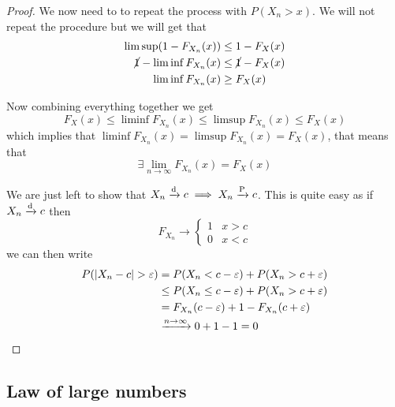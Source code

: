 \documentclass[12pt]{extarticle}
\newcommand{\convdist}{\xrightarrow{\operatorfont d}}
\newcommand{\convprob}{\xrightarrow{\operatorfont P}}
\begin{document}
\begin{proof}
    We now need to to repeat the process with $P(X_n > x)$. We will not repeat the procedure but we will get that
    \begin{align}
        \limsup(1-F_{X_n}(x))           & \leq 1 - F_X(x)          \\
        \cancel{1} - \liminf F_{X_n}(x) & \leq \cancel{1} - F_X(x) \\
        \liminf F_{X_n}(x)              & \geq F_X(x)
    \end{align}

    Now combining everything together we get
    \begin{equation}
        F_X(x) \leq \liminf F_{X_n}(x) \leq \limsup F_{X_n} (x) \leq F_X(x)
    \end{equation}
    which implies that $\liminf F_{X_n}(x) = \limsup F_{X_n}(x) = F_X(x)$, that means that
    \begin{equation}
        \exists \lim_{n \to \infty} F_{X_n}(x) = F_X(x)
    \end{equation}

    We are just left to show that $X_n \convdist c \implies X_n \convprob c$. This is quite easy as if $X_n \convdist c$ then
    \begin{equation}
        F_{X_n} \to \begin{cases}
            1 & x > c \\
            0 & x < c
        \end{cases}
    \end{equation}
    we can then write
    \begin{align}
        P(\abs{X_n - c} > \varepsilon) & = P(X_n < c - \varepsilon) + P(X_n > c + \varepsilon)       \\
                                       & \leq P(X_n \leq c - \varepsilon) + P(X_n > c + \varepsilon) \\
                                       & = F_{X_n}(c - \varepsilon) + 1 - F_{X_n}(c+ \varepsilon)    \\
                                       & \xrightarrow{n \to \infty} 0 + 1 - 1 = 0
    \end{align}
\end{proof}

\subsection{Law of large numbers}
\end{document}
